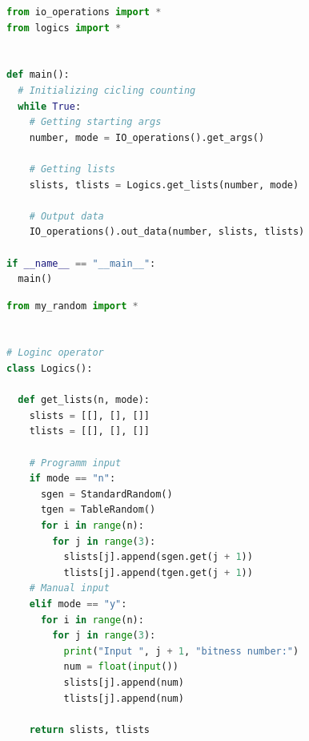 \documentclass[a4paper, 12pt]{article}
\begin{document}
\lstset{style=mystyle}

\begin{lstlisting}[language=Python, caption = Корневая часть (main.py)]
from io_operations import *
from logics import *


def main():
  # Initializing cicling counting
  while True:
    # Getting starting args
    number, mode = IO_operations().get_args()

    # Getting lists
    slists, tlists = Logics.get_lists(number, mode)

    # Output data
    IO_operations().out_data(number, slists, tlists)

if __name__ == "__main__":
  main()
\end{lstlisting}

\begin{lstlisting}[language=Python, caption = Основная логическая часть (logics.py)]
from my_random import *


# Loginc operator
class Logics():

  def get_lists(n, mode):
    slists = [[], [], []]
    tlists = [[], [], []]

    # Programm input
    if mode == "n":
      sgen = StandardRandom()
      tgen = TableRandom()
      for i in range(n):
        for j in range(3):
          slists[j].append(sgen.get(j + 1))
          tlists[j].append(tgen.get(j + 1))
    # Manual input
    elif mode == "y":
      for i in range(n):
        for j in range(3):
          print("Input ", j + 1, "bitness number:")
          num = float(input())
          slists[j].append(num)
          tlists[j].append(num)

    return slists, tlists
\end{lstlisting}
\end{document}
